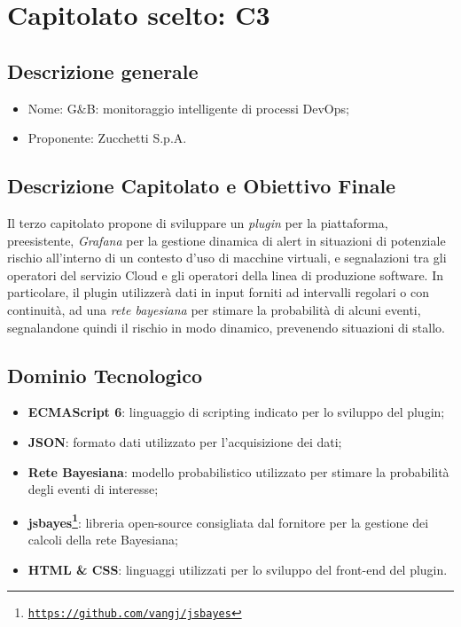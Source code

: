 \section{Capitolato scelto: C3}

\subsection{Descrizione generale}
\begin{itemize}
	\item Nome: G$\&$B: monitoraggio intelligente di processi DevOps;
	\item Proponente: Zucchetti S.p.A.
\end{itemize}

\subsection{Descrizione Capitolato e Obiettivo Finale}
Il terzo capitolato propone di sviluppare un \textit{plugin} per la piattaforma, preesistente, \textit{Grafana} per la gestione dinamica di alert in situazioni di potenziale rischio all'interno di un contesto d'uso di macchine virtuali, e segnalazioni tra gli operatori del servizio Cloud e gli operatori della linea di produzione software.
In particolare, il plugin  utilizzerà dati in input forniti ad intervalli regolari o con continuità, ad una \textit{rete bayesiana} per stimare la probabilità di alcuni eventi, segnalandone quindi il rischio in modo dinamico, prevenendo situazioni di stallo.

\subsection{Dominio Tecnologico}
\begin{itemize}
	\item \textbf{ECMAScript 6\glossario}: linguaggio di scripting indicato per lo sviluppo del plugin;
	\item \textbf{JSON}: formato dati utilizzato per l'acquisizione dei dati;
	\item \textbf{Rete Bayesiana}: modello probabilistico utilizzato per stimare la probabilità degli eventi di interesse;
	\item \textbf{jsbayes\footnote{\hyperref[Link al repository GitHub]{\texttt{https://github.com/vangj/jsbayes}}}}: libreria open-source consigliata dal fornitore per la gestione dei calcoli della rete Bayesiana;
	\item \textbf{HTML \& CSS}: linguaggi utilizzati per lo sviluppo del front-end del plugin.
\end{itemize}

